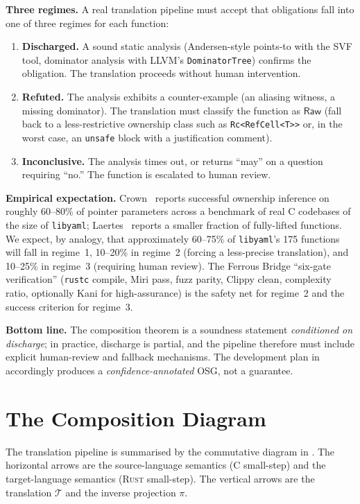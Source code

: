 \documentclass[12pt]{article}
\newcommand{\Raw}{\mathsf{Raw}}
\newcommand{\T}{\mathcal{T}}
\newcommand{\rust}{\textnormal{\textsc{Rust}}}
\newcommand{\clang}{\textnormal{\textsc{C}}}
\newcommand{\libyaml}{\texttt{libyaml}}
\theoremstyle{definition}
\theoremstyle{remark}
\begin{document}
\textbf{Three regimes.} A real translation pipeline must accept that obligations fall into one of three regimes for each function:
\begin{enumerate}
\item \textbf{Discharged.} A sound static analysis (Andersen-style points-to with the SVF tool, dominator analysis with LLVM's \texttt{DominatorTree}) confirms the obligation. The translation proceeds without human intervention.
\item \textbf{Refuted.} The analysis exhibits a counter-example (an aliasing witness, a missing dominator). The translation must classify the function as \(\Raw\) (fall back to a less-restrictive ownership class such as \texttt{Rc<RefCell<T>>} or, in the worst case, an \texttt{unsafe} block with a justification comment).
\item \textbf{Inconclusive.} The analysis times out, or returns ``may'' on a question requiring ``no.'' The function is escalated to human review.
\end{enumerate}

\textbf{Empirical expectation.} Crown~\cite{zhang2023crown} reports successful ownership inference on roughly 60--80\% of pointer parameters across a benchmark of real C codebases of the size of \libyaml{}; Laertes~\cite{emre2023laertes} reports a smaller fraction of fully-lifted functions. We expect, by analogy, that approximately 60--75\% of \libyaml{}'s 175 functions will fall in regime~1, 10--20\% in regime~2 (forcing a less-precise translation), and 10--25\% in regime~3 (requiring human review). The Ferrous Bridge ``six-gate verification'' (\texttt{rustc} compile, Miri pass, fuzz parity, Clippy clean, complexity ratio, optionally Kani for high-assurance) is the safety net for regime~2 and the success criterion for regime~3.

\textbf{Bottom line.} The composition theorem is a soundness statement \emph{conditioned on discharge}; in practice, discharge is partial, and the pipeline therefore must include explicit human-review and fallback mechanisms. The development plan in  accordingly produces a \emph{confidence-annotated} OSG, not a guarantee.

\section{The Composition Diagram}
\label{sec:diagram}

The translation pipeline is summarised by the commutative diagram in . The horizontal arrows are the source-language semantics (\clang{} small-step) and the target-language semantics (\rust{} small-step). The vertical arrows are the translation \(\T\) and the inverse projection \(\pi\).
\end{document}
